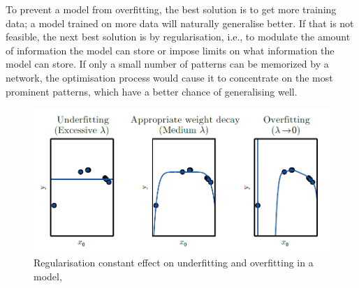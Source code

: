 \documentclass[12pt]{report}
\numberwithin{equation}{section}
\begin{document}
To prevent a model from overfitting, the best solution is to get more training data; a model trained on more data will naturally generalise better. If that is not feasible, the next best solution is by regularisation, i.e., to modulate the amount of information the model can store or impose limits on what information the model can store. If only a small number of patterns can be memorized by a network, the optimisation process would cause it to concentrate on the most prominent patterns, which have a better chance of generalising well.
\begin{figure}[htb]
\centering
\includegraphics[scale=0.8]{png/lambda.png} 
\caption[Regularisation constant effect on underfitting and overfitting in a model]{Regularisation constant effect on underfitting and overfitting in a model, }
\label{fig:lambda}
\end{figure}
\end{document}

